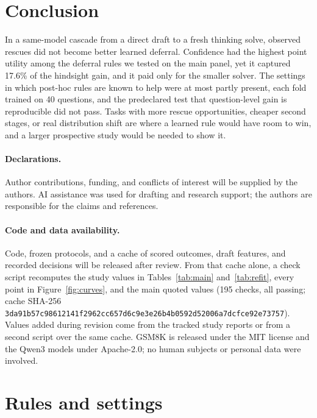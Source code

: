 \documentclass[10pt,letterpaper]{article}
\begin{document}
\section{Conclusion}

In a same-model cascade from a direct draft to a fresh thinking solve, observed rescues did not become better learned deferral. Confidence had the highest point utility among the deferral rules we tested on the main panel, yet it captured 17.6\% of the hindsight gain, and it paid only for the smaller solver. The settings in which post-hoc rules are known to help were at most partly present, each fold trained on 40 questions, and the predeclared test that question-level gain is reproducible did not pass. Tasks with more rescue opportunities, cheaper second stages, or real distribution shift are where a learned rule would have room to win, and a larger prospective study would be needed to show it.

\paragraph{Declarations.} Author contributions, funding, and conflicts of interest will be supplied by the authors. AI assistance was used for drafting and research support; the authors are responsible for the claims and references.

\paragraph{Code and data availability.} Code, frozen protocols, and a cache of scored outcomes, draft features, and recorded decisions will be released after review. From that cache alone, a check script recomputes the study values in Tables~\ref{tab:main} and~\ref{tab:refit}, every point in Figure~\ref{fig:curves}, and the main quoted values (195 checks, all passing; cache SHA-256 \nolinkurl{3da91b57c98612141f2962cc657d6c9e3e26b4b0592d52006a7dcfce92e73757}). Values added during revision come from the tracked study reports or from a second script over the same cache. GSM8K is released under the MIT license and the Qwen3 models under Apache-2.0; no human subjects or personal data were involved.




\appendix
\section{Rules and settings}
\label{app:rules}
\end{document}

